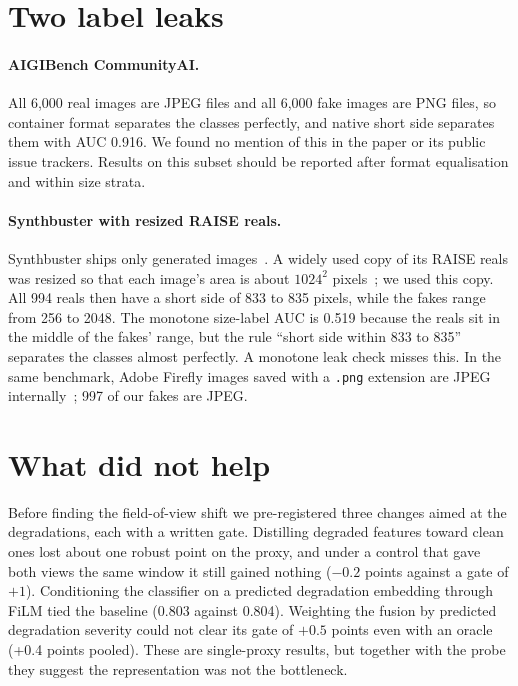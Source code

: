 \documentclass[10pt,twocolumn,letterpaper]{article}
\begin{document}
\section{Two label leaks}
\label{sec:leaks}

\paragraph{AIGIBench CommunityAI.} All 6,000 real images are JPEG files and all
6,000 fake images are PNG files, so container format separates the classes
perfectly, and native short side separates them with AUC 0.916. We found no
mention of this in the paper or its public issue trackers. Results on this
subset should be reported after format equalisation and within size strata.

\paragraph{Synthbuster with resized RAISE reals.} Synthbuster ships only
generated images~\cite{bammey2024synthbuster}. A widely used copy of its RAISE
reals was resized so that each image's area is about $1024^2$
pixels~\cite{guillaro2025bfree}; we used this copy. All 994 reals then have a
short side of 833 to 835 pixels, while the fakes range from 256 to 2048. The
monotone size-label AUC is 0.519 because the reals sit in the middle of the
fakes' range, but the rule ``short side within 833 to 835'' separates the
classes almost perfectly. A monotone leak check misses this. In the same
benchmark, Adobe Firefly images saved with a \texttt{.png} extension are JPEG
internally~\cite{ricker2026biasid}; 997 of our fakes are JPEG.

\section{What did not help}

Before finding the field-of-view shift we pre-registered three changes aimed
at the degradations, each with a written gate. Distilling degraded features
toward clean ones lost about one robust point on the proxy, and under a
control that gave both views the same window it still gained nothing
($-0.2$ points against a gate of $+1$).
Conditioning the classifier on a predicted degradation embedding through FiLM
tied the baseline (0.803 against 0.804). Weighting the fusion by predicted
degradation severity could not clear its gate of $+0.5$ points even with an
oracle (+0.4 points pooled). These are single-proxy results, but together with the probe they
suggest the representation was not the bottleneck.
\end{document}
